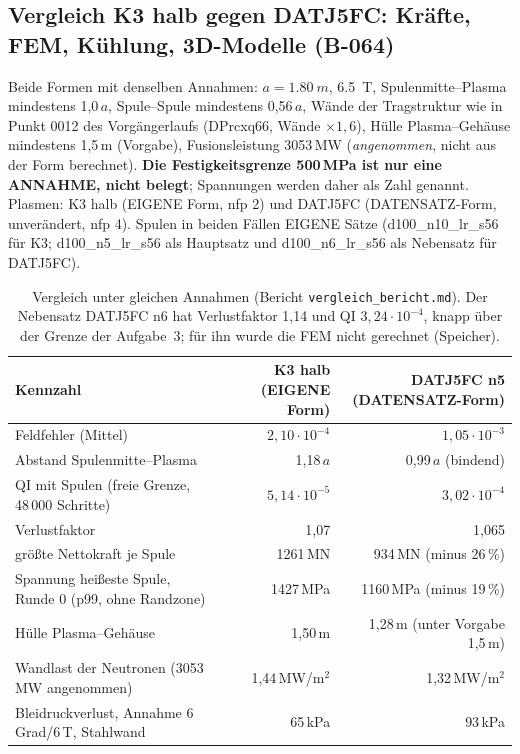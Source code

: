 \subsection{Vergleich K3 halb gegen DATJ5FC: Kräfte, FEM, Kühlung, 3D-Modelle (B-064)}
Beide Formen mit denselben Annahmen: $a=\SI{1,80}{m}$, \SI{6,5}{T}, Spulenmitte--Plasma mindestens 1,0\,$a$, Spule--Spule mindestens 0,56\,$a$, Wände der Tragstruktur wie in Punkt 0012 des Vorgängerlaufs (DPrcxq66, Wände $\times1{,}6$),
Hülle Plasma--Gehäuse mindestens 1,5\,m (Vorgabe), Fusionsleistung 3053\,MW (\emph{angenommen}, nicht aus der Form berechnet). \textbf{Die Festigkeitsgrenze 500\,MPa ist nur eine ANNAHME, nicht belegt}; Spannungen werden daher als Zahl genannt.
Plasmen: K3 halb (EIGENE Form, nfp 2) und DATJ5FC (DATENSATZ-Form, unverändert, nfp 4). Spulen in beiden Fällen EIGENE Sätze (d100\_n10\_lr\_s56 für K3; d100\_n5\_lr\_s56 als Hauptsatz und d100\_n6\_lr\_s56 als Nebensatz für DATJ5FC).
\begin{table}[H]\centering\small
\begin{tabularx}{\linewidth}{@{}Xrr@{}}\toprule
Kennzahl & K3 halb (EIGENE Form) & DATJ5FC n5 (DATENSATZ-Form) \\\midrule
Feldfehler (Mittel) & $2{,}10\cdot10^{-4}$ & $1{,}05\cdot10^{-3}$ \\
Abstand Spulenmitte--Plasma & 1,18\,$a$ & 0,99\,$a$ (bindend) \\
QI mit Spulen (freie Grenze, 48\,000 Schritte) & $5{,}14\cdot10^{-5}$ & $3{,}02\cdot10^{-4}$ \\
Verlustfaktor & 1,07 & 1,065 \\
größte Nettokraft je Spule & 1261\,MN & 934\,MN (minus 26\,\%) \\
Spannung heißeste Spule, Runde 0 (p99, ohne Randzone) & 1427\,MPa & 1160\,MPa (minus 19\,\%) \\
Hülle Plasma--Gehäuse & 1,50\,m & 1,28\,m (unter Vorgabe 1,5\,m) \\
Wandlast der Neutronen (3053\,MW angenommen) & 1,44\,MW/m$^2$ & 1,32\,MW/m$^2$ \\
Bleidruckverlust, Annahme 6 Grad/6\,T, Stahlwand & 65\,kPa & 93\,kPa \\\bottomrule
\end{tabularx}\caption{Vergleich unter gleichen Annahmen (Bericht \texttt{vergleich\_bericht.md}). Der Nebensatz DATJ5FC n6 hat Verlustfaktor 1,14 und QI $3{,}24\cdot10^{-4}$, knapp über der Grenze der Aufgabe~3; für ihn wurde die FEM nicht gerechnet (Speicher).}\end{table}
